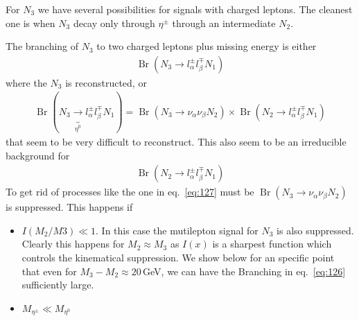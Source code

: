 For $N_3$ we have several possibilities for signals with charged leptons. The cleanest one is when $N_3$ decay only through $\eta^\pm$ through an intermediate $N_2$. 

The branching of $N_3$ to two charged leptons plus missing energy is either
\begin{align}
  \label{eq:126}
  \operatorname{Br}(N_3\to l_\alpha^\pm l_\beta^\mp N_1)
\end{align}
where the $N_3$ is reconstructed, or
\begin{align}
  \label{eq:127}
  \operatorname{Br}(N_3\underbrace{\to}_{\eta^0}l_\alpha^\pm l_\beta^\mp N_1)=\operatorname{Br}(N_3\to\nu_\alpha  \nu_\beta N_2)\times\operatorname{Br}(N_2\to l_\alpha^\pm  l_\beta^\mp N_1)
\end{align}
that seem to be very difficult to reconstruct. This also seem to be an irreducible background for
\begin{align}
  \operatorname{Br}(N_2\to l_\alpha^\pm  l_\beta^\mp N_1)
\end{align}
To get rid of processes like the one in eq.~\eqref{eq:127}  must be $\operatorname{Br}(N_3\to\nu_\alpha  \nu_\beta N_2)$ is suppressed. This happens if
\begin{itemize} %
\item %
 $I(M_2/M3)\ll1$. In this case the mutilepton signal for $N_3$ is also suppressed. Clearly this happens for $M_2\approx M_3$ as $I(x)$ is a sharpest function which controls the kinematical suppression. We show below for an specific point that even for $M_3-M_2\approx20\,$GeV, we can have the Branching in eq.~\eqref{eq:126} sufficiently large.

\item %
$M_{\eta^\pm}\ll M_{\eta^0}$

\end{itemize} %


